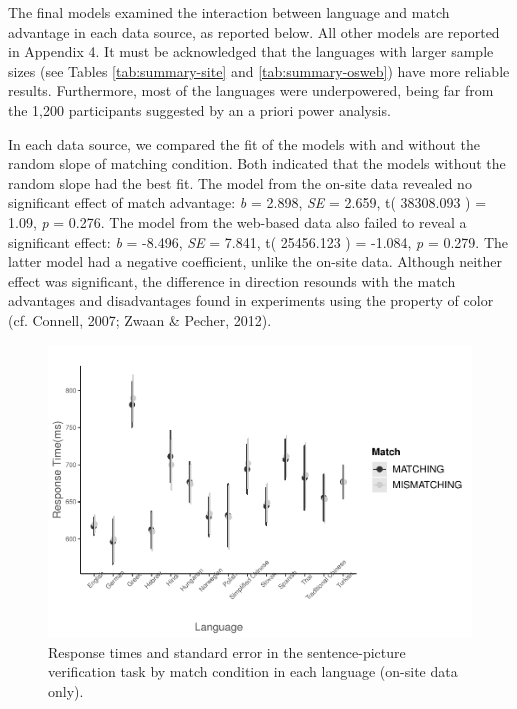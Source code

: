\documentclass[
  man]{apa6}
\begin{document}
The final models examined the interaction between language and match advantage in each data source, as reported below. All other models are reported in Appendix 4. It must be acknowledged that the languages with larger sample sizes (see Tables \ref{tab:summary-site} and \ref{tab:summary-osweb}) have more reliable results. Furthermore, most of the languages were underpowered, being far from the 1,200 participants suggested by an a priori power analysis.

In each data source, we compared the fit of the models with and without the random slope of matching condition. Both indicated that the models without the random slope had the best fit. The model from the on-site data revealed no significant effect of match advantage: \emph{b} = 2.898, \emph{SE} = 2.659, t( 38308.093 ) = 1.09, \emph{p} = 0.276. The model from the web-based data also failed to reveal a significant effect: \emph{b} = -8.496, \emph{SE} = 7.841, t( 25456.123 ) = -1.084, \emph{p} = 0.279. The latter model had a negative coefficient, unlike the on-site data. Although neither effect was significant, the difference in direction resounds with the match advantages and disadvantages found in experiments using the property of color (cf. Connell, 2007; Zwaan \& Pecher, 2012).

\begin{figure}
\centering
\includegraphics{Stage2_Report_0228_files/figure-latex/plot-SP-site-lme-1.pdf}
\caption{\label{fig:plot-SP-site-lme}Response times and standard error in the sentence-picture verification task by match condition in each language (on-site data only).}
\end{figure}
\end{document}
